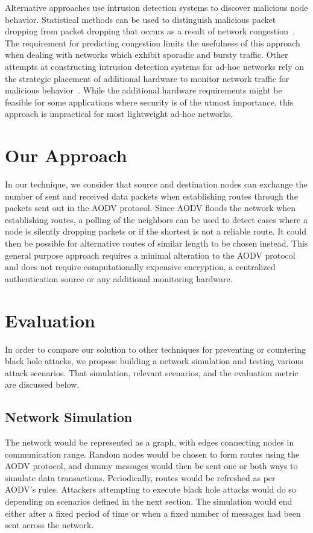 \documentclass[12pt,a4paper]{report}
\begin{document}
Alternative approaches use intrusion detection systems to discover malicious node behavior. Statistical methods can be used to distinguish malicious packet dropping from packet dropping that occurs as a result of network congestion~\cite{1258776}. The requirement for predicting congestion limits the usefulness of this approach when dealing with networks which exhibit sporadic and bursty traffic. Other attempts at constructing intrusion detection systems for ad-hoc networks rely on the strategic placement of additional hardware to monitor network traffic for malicious behavior~\cite{Tseng:2003:SID:986858.986876}. While the additional hardware requirements might be feasible for some applications where security is of the utmost importance, this approach is impractical for most lightweight ad-hoc networks.

\pagebreak
\section{Our Approach}
In our technique, we consider that source and destination nodes can exchange the number of sent and received data packets when establishing routes through the packets sent out in the AODV protocol. Since AODV floods the network when establishing routes, a polling of the neighbors can be used to detect cases where a node is silently dropping packets or if the shortest is not a reliable route.  It could then be possible for alternative routes of similar length to be chosen instead. This general purpose approach requires a minimal alteration to the AODV protocol and does not require computationally expensive encryption, a centralized authentication source or any additional monitoring hardware.

\pagebreak
\section{Evaluation}
In order to compare our solution to other techniques for preventing or countering black hole attacks, we propose building a network simulation and testing various attack scenarios. That simulation, relevant scenarios, and the evaluation metric are discussed below.

\subsection{Network Simulation}
The network would be represented as a graph, with edges connecting nodes in communication range. Random nodes would be chosen to form routes using the AODV protocol, and dummy messages would then be sent one or both ways to simulate data transactions. Periodically, routes would be refreshed as per AODV's rules. Attackers attempting to execute black hole attacks would do so depending on scenarios defined in the next section. The simulation would end either after a fixed period of time or when a fixed number of messages had been sent across the network.
\end{document}
